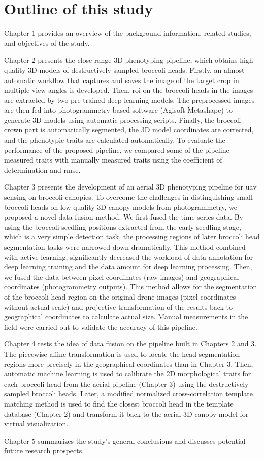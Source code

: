 \section{Outline of this study}

Chapter 1 provides an overview of the background information, related studies, and objectives of the study.

Chapter 2 presents the close-range 3D phenotyping pipeline, which obtains high-quality 3D models of destructively sampled broccoli heads. Firstly, an almost-automatic workflow that captures and saves the image of the target crop in multiple view angles is developed. Then, \gls{roi} on the broccoli heads in the images are extracted by two pre-trained deep learning models. The preprocessed images are then fed into photogrammetry-based software (Agisoft Metashape) to generate 3D models using automatic processing scripts. Finally, the broccoli crown part is automatically segmented, the 3D model coordinates are corrected, and the phenotypic traits are calculated automatically. To evaluate the performance of the proposed pipeline, we compared some of the pipeline-measured traits with manually measured traits using the coefficient of determination and \gls{rmse}.

Chapter 3 presents the development of an aerial 3D phenotyping pipeline for \gls{uav} sensing on broccoli canopies. To overcome the challenges in distinguishing small broccoli heads on low-quality 3D canopy models from photogrammetry, we proposed a novel data-fusion method. We ﬁrst fused the time-series data. By using the broccoli seedling positions extracted from the early seedling stage, which is a very simple detection task, the processing regions of later broccoli head segmentation tasks were narrowed down dramatically. This method combined with active learning, signiﬁcantly decreased the workload of data annotation for deep learning training and the data amount for deep learning processing. Then, we fused the data between pixel coordinates (raw images) and geographical coordinates (photogrammetry outputs). This method allows for the segmentation of the broccoli head region on the original drone images (pixel coordinates without actual scale) and projective transformation of the results back to geographical coordinates to calculate actual size. Manual measurements in the field were carried out to validate the accuracy of this pipeline.

Chapter 4 tests the idea of data fusion on the pipeline built in Chapters 2 and 3. The piecewise affine transformation is used to locate the head segmentation regions more precisely in the geographical coordinates than in Chapter 3. Then, automatic machine learning is used to calibrate the 2D morphological traits for each broccoli head from the aerial pipeline (Chapter 3) using the destructively sampled broccoli heads. Later, a modified normalized cross-correlation template matching method is used to find the closest broccoli head in the template database (Chapter 2) and transform it back to the aerial 3D canopy model for virtual visualization.

Chapter 5 summarizes the study's general conclusions and discusses potential future research prospects.